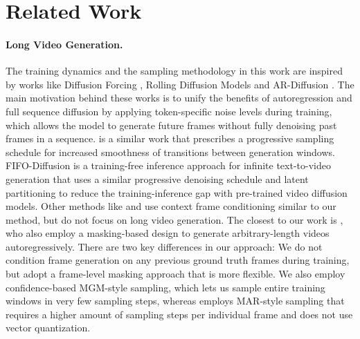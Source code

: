 \section{Related Work}
\paragraph{Long Video Generation.} 
The training dynamics and the sampling methodology in this work are inspired by works like Diffusion Forcing \cite{chen2024diffusionforcing,song2025historyguidedvideodiffusion}, Rolling Diffusion Models \cite{ruhe2024rollingdiffusionmodels} and AR-Diffusion \cite{wu2023ar}. The main motivation behind these works is to unify the benefits of autoregression and full sequence diffusion by applying token-specific noise levels during training, which allows the model to generate future frames without fully denoising past frames in a sequence. \citet{xie2024progressive} is a similar work that prescribes a progressive sampling schedule for increased smoothness of transitions between generation windows. FIFO-Diffusion is a training-free inference approach for infinite text-to-video generation that uses a similar progressive denoising schedule and latent partitioning to reduce the training-inference gap with pre-trained video diffusion models. Other methods like \cite{gao2024vid, zheng2024open} and \cite{blattmann2023stable} use context frame conditioning similar to our method, but do not focus on long video generation. The closest to our work is \citet{zhou2025taming}, who also employ a masking-based design to generate arbitrary-length videos autoregressively. There are two key differences in our approach: We do not condition frame generation on any previous ground truth frames during training, but adopt a frame-level masking approach that is more flexible. We also employ confidence-based MGM-style sampling, which lets us sample entire training windows in very few sampling steps, whereas \citet{zhou2025taming} employs MAR-style \cite{li2024autoregressive} sampling that requires a higher amount of sampling steps per individual frame and does not use vector quantization.
\vspace{-10pt}

